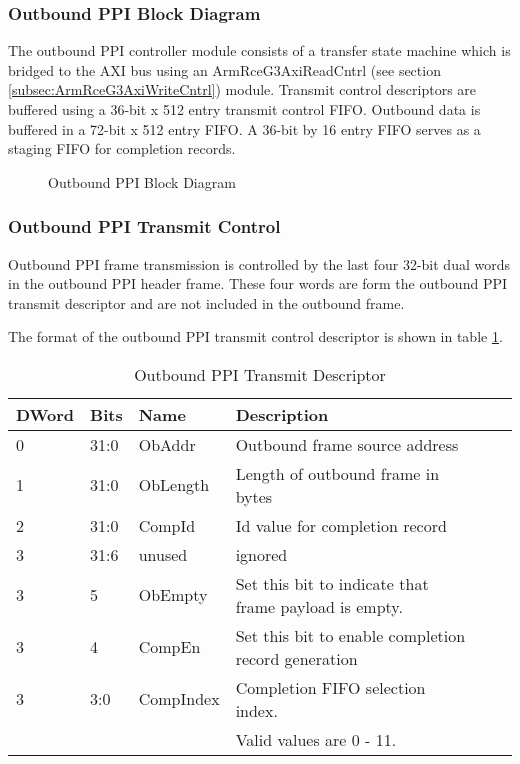 \documentclass[11pt]{article}
\begin{document}
\subsubsection{Outbound PPI Block Diagram}

The outbound PPI controller module consists of a transfer state machine which is bridged to the AXI bus using an ArmRceG3AxiReadCntrl (see section \ref{subsec:ArmRceG3AxiWriteCntrl})
module. Transmit control descriptors are buffered using a 36-bit x 512 entry transmit control FIFO. Outbound data is buffered in a 72-bit x 512 entry FIFO. 
A 36-bit by 16 entry FIFO serves as a staging FIFO for completion records. 

\begin{figure}[H]
   \centering
   \caption{Outbound PPI Block Diagram}
   \label{fig:ob_ppi_block}
\end{figure}

\subsubsection{Outbound PPI Transmit Control}

Outbound PPI frame transmission is controlled by the last four 32-bit dual words in the outbound PPI header frame. 
These four words are form the outbound PPI transmit descriptor and are not included in the outbound frame. 

The format of the outbound PPI transmit control descriptor is shown in table \ref{tab:ob_ppi_cntrl}.

\begin{table}[H]
\small
\centering
   \begin{tabular}{| l | l | l | l | l | l | } 
      \hline \textbf{DWord} & \textbf{Bits} & \textbf{Name} & \textbf{Description} \\
      \hline 0              & 31:0          & ObAddr        & Outbound frame source address     \\
      \hline 1              & 31:0          & ObLength      & Length of outbound frame in bytes \\
      \hline 2              & 31:0          & CompId        & Id value for completion record    \\
      \hline 3              & 31:6          & unused        & ignored                           \\
      \hline 3              & 5             & ObEmpty       & Set this bit to indicate that frame payload is empty. \\
      \hline 3              & 4             & CompEn        & Set this bit to enable completion record generation \\
      \hline 3              & 3:0           & CompIndex     & Completion FIFO selection index.  \\
                            &               &               & Valid values are 0 - 11.          \\
      \hline
   \end{tabular}
   \caption{Outbound PPI Transmit Descriptor}
   \label{tab:ob_ppi_cntrl}
\end{table}
\end{document}
